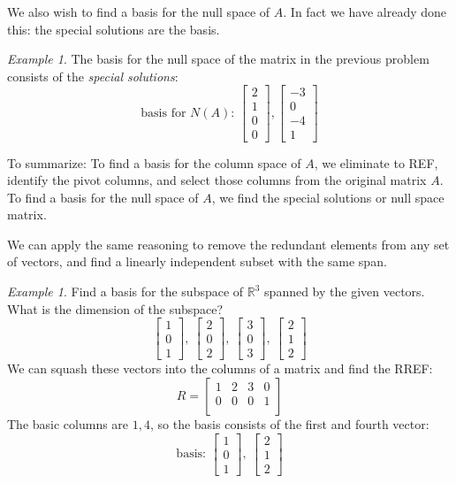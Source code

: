 \documentclass[11pt,oneside]{amsbook}
\newcommand{\R}{\mathbb R}
\theoremstyle{definition}
\theoremstyle{plain}
\theoremstyle{definition}
\theoremstyle{remark}
\newtheorem{example}[theorem]{Example}
\numberwithin{equation}{section}
\numberwithin{figure}{section}
\begin{document}
We also wish to find a basis for the null space of $A$. In fact we have already done this: the special solutions are the basis.

\begin{example}
  The basis for the null space of the matrix in the previous problem consists of the \emph{special solutions}:
  \[\text{basis for $N(A)$: }\begin{bmatrix}2\\1\\0\\0\end{bmatrix},
  \begin{bmatrix}-3\\0\\-4\\1\end{bmatrix}
  \]
\end{example}

To summarize: To find a basis for the column space of $A$, we eliminate to REF, identify the pivot columns, and select those columns from the original matrix $A$. To find a basis for the null space of $A$, we find the special solutions or null space matrix.

We can apply the same reasoning to remove the redundant elements from any set of vectors, and find a linearly independent subset with the same span.

\begin{example}
  Find a basis for the subspace of $\R^3$ spanned by the given vectors. What is the dimension of the subspace?
  \[\begin{bmatrix}1\\0\\1\end{bmatrix},\ 
    \begin{bmatrix}2\\0\\2\end{bmatrix},\ 
    \begin{bmatrix}3\\0\\3\end{bmatrix},\ 
    \begin{bmatrix}2\\1\\2\end{bmatrix}
  \]
  We can squash these vectors into the columns of a matrix and find the RREF:
  \[R=\begin{bmatrix}1&2&3&0\\0&0&0&1\\&&&\end{bmatrix}
  \]
  The basic columns are $1,4$, so the basis consists of the first and fourth vector:
  \[\text{basis: }\begin{bmatrix}1\\0\\1\end{bmatrix},\ 
  \begin{bmatrix}2\\1\\2\end{bmatrix}
  \]
\end{example}
\end{document}
